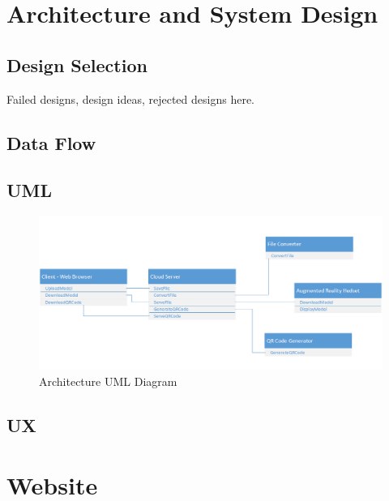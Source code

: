  \section{Architecture and System Design}
 
 
 
   \subsection{Design Selection}
 Failed designs, design ideas, rejected designs here.
 
 \subsection{Data Flow}
 \subsection{UML}
    
   \begin{figure}[H]
   	\centering
   	\includegraphics[width=\textwidth]{UML.png}
   	\caption{Architecture UML Diagram} 	
   \end{figure}
   
 \subsection{UX}

 \section{Website}

